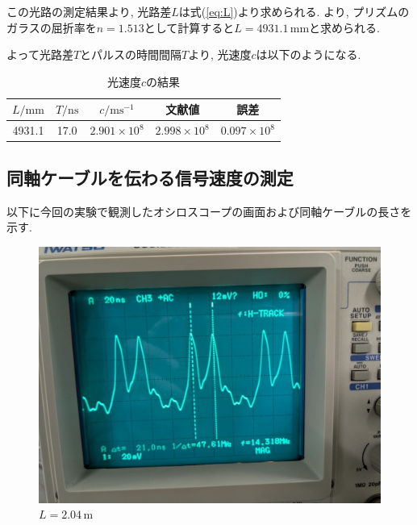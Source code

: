 \documentclass{jarticle}
\begin{document}
この光路の測定結果より, 光路差$L$は式(\ref{eq:L})より求められる.
\cite{Glass-Materials}より, プリズムのガラスの屈折率を$n=1.513$として計算すると$L=4931.1\,\mathrm{mm}$と求められる.

よって光路差$T$とパルスの時間間隔$T$より, 光速度$c$は以下のようになる.

\begin{table}[h]
  \centering
  \caption{光速度$c$の結果}
  \begin{tabular}{ccccc}
    \hline
    $L/\mathrm{mm}$ & $T/\mathrm{ns}$ & $c/\mathrm{ms^{-1}}$ & 文献値\cite{light-speed} & 誤差 \\
    \hline
    4931.1 & 17.0 & $2.901\times10^8$ & $2.998\times10^8$ & $0.097\times10^8$ \\
    \hline
  \end{tabular}
\end{table}


\subsection{同軸ケーブルを伝わる信号速度の測定}

以下に今回の実験で観測したオシロスコープの画面および同軸ケーブルの長さを示す.

\begin{figure}[H]
  \begin{center}
    \includegraphics[scale=0.3]{cable1_result_picture.jpg}
    \caption{$L=2.04\,\mathrm{m}$}
  \end{center}
\end{figure}
\end{document}
